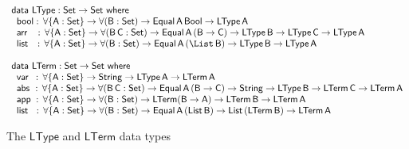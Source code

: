 \documentclass[sigplan,10pt]{acmart}
\begin{document}
\begin{figure*}[t]

\begin{adjustbox}{varwidth=7.3in, max width=7.1in, margin=-0.0in 0in
      -0.2in 0in, fbox, center} 

{\small
\[\begin{array}{l}
\mathsf{data\ LType : Set \to Set\ where}\\
\mathsf{\;\;bool :\, \forall \{A : Set\} \to \forall (B : Set) \to Equal\,A\,Bool
  \to LType\,A}\\ 
\mathsf{\;\;arr\;\;\; :\, \forall \{A : Set\} \to \forall (B\,C : Set) \to
  Equal\,A\,(B \to C) \to LType\,B \to LType\,C \to LType\,A}\\ 
  \mathsf{\;\;list\,\;\; :\,  \forall \{A : Set\} \to\forall (B : Set) \to
    Equal\,A\,(\List\,B) \to LType\,B \to LType\,A}\\
  \\
\mathsf{data\ LTerm : Set \to Set\ where}\\
\mathsf{\;\;var\,\,\,:\,  \forall \{A : Set\} \to String \to LType\,A \to
  LTerm\,A} \\  
\mathsf{\;\;abs\,\, :\,  \forall \{A : Set\} \to \forall (B\,C : Set) \to
  Equal\,A\,(B \to C) \to String \to LType\,B \to LTerm\,C \to
  LTerm\,A}\\ 
  \mathsf{\;\;app\; :\,  \forall \{A : Set\} \to \forall (B : Set) \to
    LTerm (B \to A) \to LTerm\,B \to LTerm\,A} \\ 
  \mathsf{\;\;list\;\,\, :\,  \forall \{A : Set\} \to \forall (B : Set) \to
    Equal\,A\,(List\,B) \to List\,(LTerm\,B) \to LTerm\,A} 
\end{array}\]}

\vspace*{-0.1in}

\caption{The $\mathsf{LType}$ and $\mathsf{LTerm}$ data
  types}\label{fig:type-and-term}
\end{adjustbox}
\end{figure*}
\end{document}
